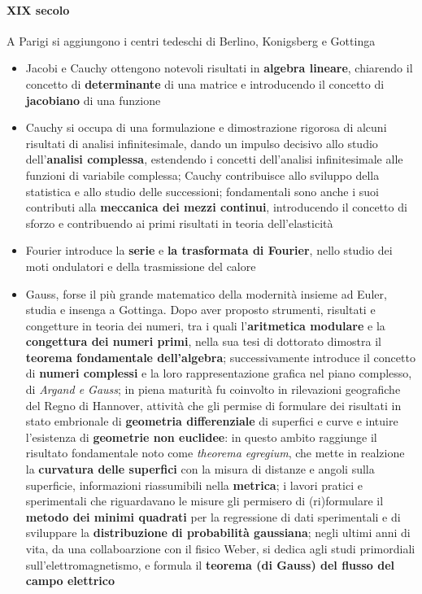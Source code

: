 \paragraph{XIX secolo}
A Parigi si aggiungono i centri tedeschi di Berlino, Konigsberg e Gottinga
\begin{itemize}
    \item Jacobi e Cauchy ottengono notevoli risultati in \textbf{algebra lineare}, chiarendo il concetto di \textbf{determinante} di una matrice e introducendo il concetto di \textbf{jacobiano} di una funzione
    \item Cauchy si occupa di una formulazione e dimostrazione rigorosa di alcuni risultati di analisi infinitesimale, dando un impulso decisivo allo studio dell'\textbf{analisi complessa}, estendendo i concetti dell'analisi infinitesimale alle funzioni di variabile complessa; Cauchy contribuisce allo sviluppo della statistica e allo studio delle successioni; fondamentali sono anche i suoi contributi alla \textbf{meccanica dei mezzi continui}, introducendo il concetto di sforzo e contribuendo ai primi risultati in teoria dell'elasticità
    \item Fourier introduce la \textbf{serie} e \textbf{la trasformata di Fourier}, nello studio dei moti ondulatori e della trasmissione del calore
    \item Gauss, forse il più grande matematico della modernità insieme ad Euler, studia e insenga a Gottinga. Dopo aver proposto strumenti, risultati e congetture in teoria dei numeri, tra i quali l'\textbf{aritmetica modulare} e la \textbf{congettura dei numeri primi}, nella sua tesi di dottorato dimostra il \textbf{teorema fondamentale dell'algebra}; successivamente introduce il concetto di \textbf{numeri complessi} e la loro rappresentazione grafica nel piano complesso, di \textit{Argand e Gauss}; in piena maturità fu coinvolto in rilevazioni geografiche del Regno di Hannover, attività che gli permise di formulare dei risultati in stato embrionale di \textbf{geometria differenziale} di superfici e curve e intuire l'esistenza di \textbf{geometrie non euclidee}: in questo ambito raggiunge il risultato fondamentale noto come \textit{theorema egregium}, che mette in realzione la \textbf{curvatura delle superfici} con la misura di distanze e angoli sulla superficie, informazioni riassumibili nella \textbf{metrica}; i lavori pratici e sperimentali che riguardavano le misure gli permisero di (ri)formulare il \textbf{metodo dei minimi quadrati} per la regressione di dati sperimentali e di sviluppare la \textbf{distribuzione di probabilità gaussiana}; negli ultimi anni di vita, da una collaboarzione con il fisico Weber, si dedica agli studi primordiali sull'elettromagnetismo, e formula il \textbf{teorema (di Gauss) del flusso del campo elettrico}

\end{itemize}
